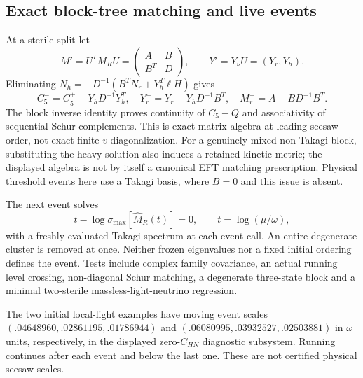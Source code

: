 \documentclass[11pt]{article}
\newcommand{\B}{\mathcal B}
\begin{document}
\subsection{Exact block-tree matching and live events}
At a sterile split let
\begin{equation}
 M'=U^TM_RU=\begin{pmatrix}A&B\\B^T&D\end{pmatrix},\qquad
 Y'=Y_\nu U=(Y_r,Y_h).
\end{equation}
Eliminating $N_h=-D^{-1}(B^TN_r+Y_h^T\ell H)$ gives
\begin{equation}
 \boxed{\ C_5^-=C_5^+-Y_hD^{-1}Y_h^T,\quad
 Y_r^-=Y_r-Y_hD^{-1}B^T,\quad M_r^-=A-BD^{-1}B^T.\ }
\end{equation}
The block inverse identity proves continuity of $C_5-Q$ and
associativity of sequential Schur complements. This is exact matrix
algebra at leading seesaw order, not exact finite-$v$ diagonalization.
For a genuinely mixed non-Takagi block, substituting the heavy solution
also induces a retained kinetic metric; the displayed algebra is not
by itself a canonical EFT matching prescription. Physical threshold
events here use a Takagi basis, where $B=0$ and this issue is absent.

The next event solves
\begin{equation}
 t-\log\sigma_{\max}[\widehat M_R(t)]=0,\qquad t=\log(\mu/\omega),
\end{equation}
with a freshly evaluated Takagi spectrum at each event call.
An entire degenerate cluster is removed at once. Neither frozen
eigenvalues nor a fixed initial ordering defines the event. Tests
include complex family covariance, an actual running level crossing,
non-diagonal Schur matching, a degenerate three-state block and a
minimal two-sterile massless-light-neutrino regression.

The two initial local-light examples have moving event scales
$(.04648960,.02861195,.01786944)$ and
$(.06080995,.03932527,.02503881)$ in $\omega$ units, respectively,
in the displayed zero-$C_{HN}$ diagnostic subsystem. Running continues
after each event and below the last one. These are not certified
physical seesaw scales.
\end{document}
